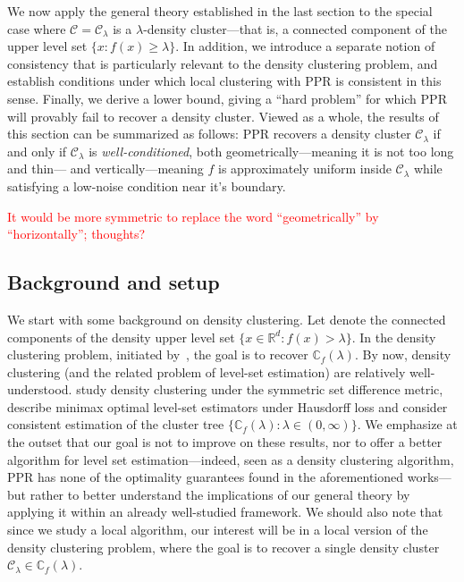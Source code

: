 \documentclass[11pt,twoside]{article}
\newcommand{\Reals}{\mathbb{R}}
\newcommand{\1}{\mathbf{1}}
\newcommand{\Rd}{\Reals^d}
\newcommand{\mc}[1]{\mathcal{#1}}
\begin{document}
We now apply the general theory established in the last section to the special case where $\mc{C} = \mc{C}_{\lambda}$ is a $\lambda$-density cluster---that is, a connected component of the upper level set $\{x: f(x) \geq \lambda\}$. In addition, we introduce a separate notion of consistency that is particularly relevant to the density clustering problem, and establish conditions under which local clustering with PPR is consistent in this sense. Finally, we derive a lower bound, giving a ``hard problem'' for which PPR will provably fail to recover a density cluster. Viewed as a whole, the results of this section can be summarized as follows: PPR recovers a density cluster $\mc{C}_{\lambda}$ if and only if $\mc{C}_{\lambda}$ is \emph{well-conditioned}, both geometrically---meaning it is not too long and thin--- and vertically---meaning $f$ is approximately uniform inside $\mc{C}_{\lambda}$ while satisfying a low-noise condition near it's boundary.

\textcolor{red}{It would be more symmetric to replace the word ``geometrically'' by ``horizontally''; thoughts?}

\subsection{Background and setup}

We start with some background on density clustering. Let  denote the connected components of the density upper level set $\{x \in \Rd: f(x) > \lambda\}$. In the density clustering problem, initiated by~\cite{hartigan1981}, the goal is to recover $\mathbb{C}_{f}(\lambda)$. By now, density clustering (and the related problem of level-set estimation) are relatively well-understood. \citet{polonik1995,
	rigollet2009} study density clustering under the symmetric set difference
metric, \citet{tsybakov1997,singh2009} describe minimax optimal level-set
estimators under Hausdorff loss and
\citet{hartigan1981,chaudhuri2010,balakrishnan2013,kpotufe11} consider
consistent estimation of the cluster tree $\{\mathbb{C}_f(\lambda): \lambda \in (0,\infty)\}$. We emphasize at the outset that our goal is
not to improve on these results, nor to offer a better algorithm for level set
estimation---indeed, seen as a density clustering algorithm, PPR has none 
of the optimality guarantees found in the aforementioned works---but rather to better understand the implications of our general theory by applying it within an already well-studied framework. We should also note that since we study a local algorithm, our interest will be in a local version of the density clustering problem, where the goal is to recover a single density cluster $\mc{C}_{\lambda} \in \mathbb{C}_f(\lambda)$. 
\end{document}
